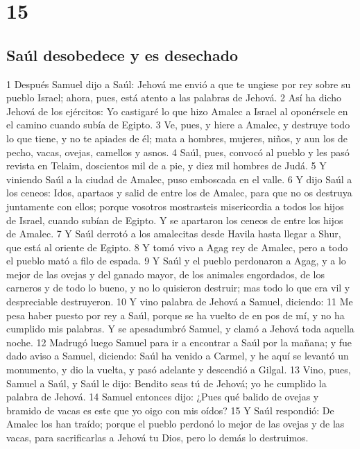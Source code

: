 \chapter{15}

\section*{Saúl desobedece y es desechado}

1 Después Samuel dijo a Saúl: Jehová me envió a que te ungiese por rey sobre su pueblo Israel; ahora, pues, está atento a las palabras de Jehová.
2 Así ha dicho Jehová de los ejércitos: Yo castigaré lo que hizo Amalec a Israel al oponérsele en el camino cuando subía de Egipto. 
3 Ve, pues, y hiere a Amalec, y destruye todo lo que tiene, y no te apiades de él; mata a hombres, mujeres, niños, y aun los de pecho, vacas, ovejas, camellos y asnos.
4 Saúl, pues, convocó al pueblo y les pasó revista en Telaim, doscientos mil de a pie, y diez mil hombres de Judá.
5 Y viniendo Saúl a la ciudad de Amalec, puso emboscada en el valle.
6 Y dijo Saúl a los ceneos: Idos, apartaos y salid de entre los de Amalec, para que no os destruya juntamente con ellos; porque vosotros mostrasteis misericordia a todos los hijos de Israel, cuando subían de Egipto. Y se apartaron los ceneos de entre los hijos de Amalec.
7 Y Saúl derrotó a los amalecitas desde Havila hasta llegar a Shur, que está al oriente de Egipto.
8 Y tomó vivo a Agag rey de Amalec, pero a todo el pueblo mató a filo de espada.
9 Y Saúl y el pueblo perdonaron a Agag, y a lo mejor de las ovejas y del ganado mayor, de los animales engordados, de los carneros y de todo lo bueno, y no lo quisieron destruir; mas todo lo que era vil y despreciable destruyeron.
10 Y vino palabra de Jehová a Samuel, diciendo:
11 Me pesa haber puesto por rey a Saúl, porque se ha vuelto de en pos de mí, y no ha cumplido mis palabras. Y se apesadumbró Samuel, y clamó a Jehová toda aquella noche.
12 Madrugó luego Samuel para ir a encontrar a Saúl por la mañana; y fue dado aviso a Samuel, diciendo: Saúl ha venido a Carmel, y he aquí se levantó un monumento, y dio la vuelta, y pasó adelante y descendió a Gilgal.
13 Vino, pues, Samuel a Saúl, y Saúl le dijo: Bendito seas tú de Jehová; yo he cumplido la palabra de Jehová.
14 Samuel entonces dijo: ¿Pues qué balido de ovejas y bramido de vacas es este que yo oigo con mis oídos?
15 Y Saúl respondió: De Amalec los han traído; porque el pueblo perdonó lo mejor de las ovejas y de las vacas, para sacrificarlas a Jehová tu Dios, pero lo demás lo destruimos.

